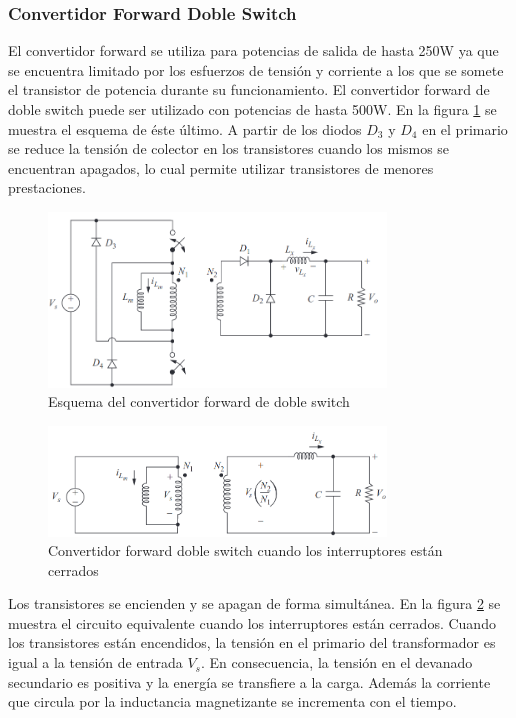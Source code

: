 \subsubsection{Convertidor Forward Doble Switch}

El convertidor forward se utiliza para potencias de salida de hasta 250W ya que se encuentra limitado 
por los esfuerzos de tensión y corriente a los que se somete el transistor de potencia durante su funcionamiento. 
El convertidor forward de doble switch puede ser utilizado con potencias de hasta 500W.
En la figura \ref{fig:forward_doble_switch} se muestra el esquema de éste último.
A partir de los diodos $D_3$ y $D_4$ en el primario se reduce la tensión de colector en los transistores cuando los mismos 
se encuentran apagados, lo cual permite utilizar transistores de menores prestaciones.

\begin{figure}[H]
    \centering
    \includegraphics[width=0.8\textwidth]{../images/hart/forward_doble_switch.png}
    \caption{Esquema del convertidor forward de doble switch}
    \label{fig:forward_doble_switch}
\end{figure}

\begin{figure}[H]
    \centering
    \includegraphics[width=0.8\textwidth]{images/hart/forward_doble_switch_closed.png}
    \caption{Convertidor forward doble switch cuando los interruptores están cerrados}
    \label{fig:forward_doble_switch_closed}
\end{figure}

Los transistores se encienden y se apagan de forma simultánea. 
En la figura \ref{fig:forward_doble_switch_closed} se muestra el circuito equivalente cuando los interruptores están cerrados.  
Cuando los transistores están encendidos, la tensión en el primario del transformador es igual a la tensión de entrada $V_s$. 
En consecuencia, la tensión en el devanado secundario es positiva y la energía se transfiere a la carga. 
Además la corriente que circula por la inductancia magnetizante se incrementa con el tiempo. 

